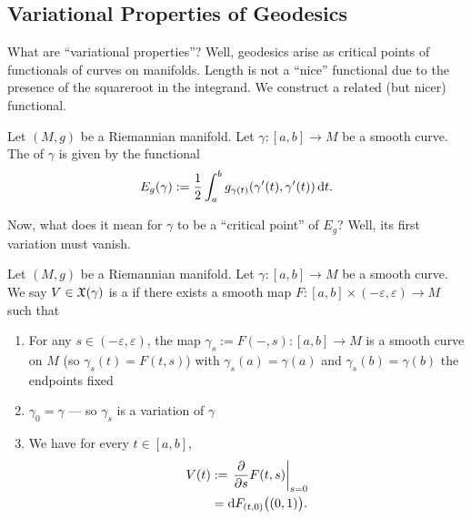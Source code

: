 \subsection{Variational Properties of Geodesics}

\begin{node}
What are ``variational properties''? Well, geodesics arise as critical
points of functionals of curves on manifolds. Length is not a ``nice''
functional due to the presence of the squareroot in the integrand. We
construct a related (but nicer) functional.
\end{node}

\begin{definition}
Let $(M,g)$ be a Riemannian manifold. Let $\gamma\colon[a,b]\to M$
be a smooth curve. The  of $\gamma$ is given by the
functional
\begin{equation}
E_{g}(\gamma):=\frac{1}{2}\int^{b}_{a}g_{\gamma(t)}(\gamma'(t),\gamma'(t))\,\mathrm{d} t.
\end{equation}
\end{definition}

\begin{node}
Now, what does it mean for $\gamma$ to be a ``critical point'' of
$E_{g}$? Well, its first variation must vanish.
\end{node}

\begin{definition}
Let $(M,g)$ be a Riemannian manifold. Let $\gamma\colon[a,b]\to M$ be a
smooth curve. We say $V\in\mathfrak{X}(\gamma)$ is a 
if there exists a smooth map
$F\colon[a,b]\times(-\varepsilon,\varepsilon)\to M$
such that
\begin{enumerate}
\item For any $s\in(-\varepsilon,\varepsilon)$, the map
  $\gamma_{s}:=F(-,s)\colon[a,b]\to M$ is a smooth curve on $M$ (so
  $\gamma_{s}(t)=F(t,s)$) with $\gamma_{s}(a)=\gamma(a)$ and
  $\gamma_{s}(b)=\gamma(b)$ the endpoints fixed
\item $\gamma_{0}=\gamma$ --- so $\gamma_{s}$ is a variation of $\gamma$
\item We have for every $t\in[a,b]$,
  \begin{equation}
\begin{split}
V(t) &:= \left.\frac{\partial}{\partial s}F(t,s)\right|_{s=0}\\
&=\mathrm{d} F_{(t,0)}\bigl((0,1)\bigr).
\end{split}
  \end{equation}
\end{enumerate}
\end{definition}